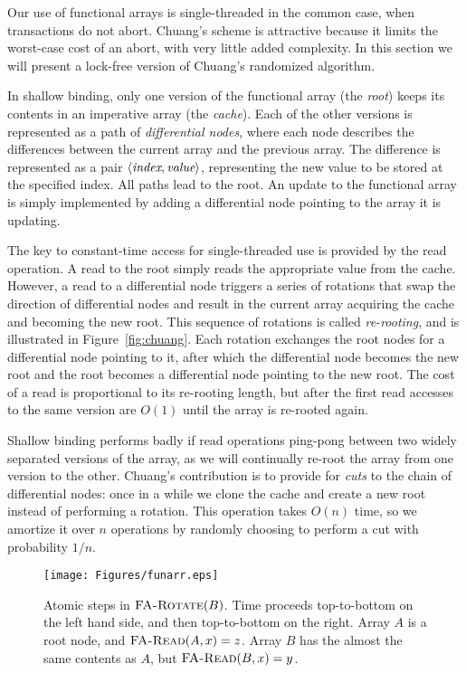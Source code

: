 \documentclass{csa-sig-alternate}
\newcommand{\funcname}[1]{\ensuremath{\text{\sc #1}}}
\newcommand{\tuple}[1]{\ensuremath{\left\langle #1 \right\rangle}}
\begin{document}
{Our use of functional arrays is single-threaded in the common case,
when transactions do not abort.  Chuang's scheme is attractive because
it limits the worst-case cost of an abort, with very little added
complexity.   In this section we will present a lock-free version of
Chuang's randomized algorithm.

In shallow binding, only one version of the functional array (the
\emph{root}) keeps its contents in an imperative array (the
\emph{cache}).   Each of the other versions is represented as a path
of \emph{differential nodes}, where each node describes the
differences between the current array and the previous array.  The
difference is represented as a pair \tuple{\text{\it index},\text{\it value}},
representing the new value to be stored at the specified index.
All paths lead to the root.  An update to the functional array is
simply implemented by adding a differential node pointing to the array it is
updating.

The key to constant-time access for single-threaded use is provided by the read
operation.  A read to the root simply reads the appropriate value from
the cache.  However, a read to a differential node triggers a series
of rotations that swap the direction of differential nodes and result
in the current array acquiring the cache and becoming the new root.
This sequence of rotations is called \emph{re-rooting}, and is
illustrated in Figure~\ref{fig:chuang}.  Each rotation
exchanges the root nodes for a differential node pointing to it, after
which the differential node becomes the new root and the root becomes
a differential node pointing to the new root. The cost of a read is
proportional to its re-rooting length, but after the first read
accesses to the same version are $O(1)$ until the array is re-rooted again.

Shallow binding performs badly if read operations ping-pong between two
widely separated versions of the array, as we will continually
re-root the array from one version to the other.
Chuang's contribution is to provide for \emph{cuts} to the chain of
differential nodes: once in a while we clone the cache and create a
new root instead of performing a rotation.  This operation takes
$O(n)$ time, so we amortize it over $n$ operations by randomly
choosing to perform a cut with probability $1/n$.

\begin{figure*}\centering
\texttt{[image: Figures/funarr.eps]}
\figadjust%
\caption{Atomic steps in $\funcname{FA-Rotate}(B)$.  Time proceeds top-to-bottom
  on the left hand side, and then top-to-bottom on the right.
  Array $A$ is a root node, and $\funcname{FA-Read}(A, x)=z$.
  Array $B$ has the almost the same contents as $A$, but
  $\funcname{FA-Read}(B, x)=y$.}
\label{fig:funarr}
\end{figure*}

}
\end{document}
